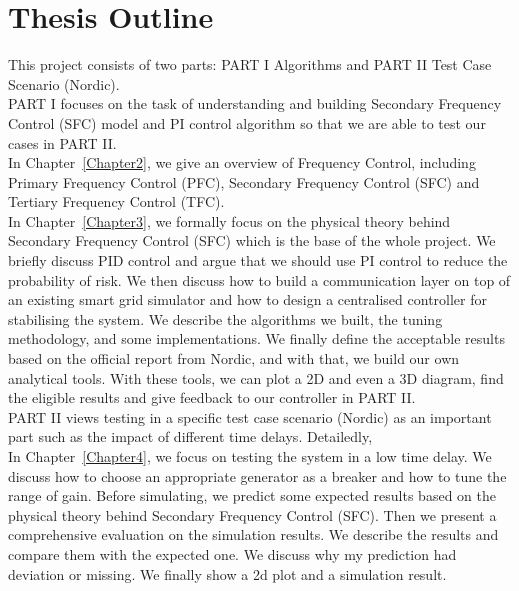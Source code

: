 \section{Thesis Outline} %
This project consists of two parts: PART I Algorithms and PART II Test Case Scenario (Nordic).\\

PART I focuses on the task of understanding and building Secondary Frequency Control (SFC) model and PI control algorithm so that we are able to test our cases in PART II.\\


In Chapter~\ref{Chapter2}, we give an overview of Frequency Control, including Primary Frequency Control (PFC), Secondary Frequency Control (SFC) and Tertiary Frequency Control (TFC).\\

In Chapter~\ref{Chapter3}, we formally focus on the physical theory behind Secondary Frequency Control (SFC) which is the base of the whole project. We briefly discuss PID control and argue that we should use PI control to reduce the probability of risk. We then discuss how to build a communication layer on top of an existing smart grid simulator and how to design a centralised controller for stabilising the system. We describe the algorithms we built, the tuning methodology, and some implementations. We finally define the acceptable results based on the official report from Nordic, and with that, we build our own analytical tools. With these tools, we can plot a 2D and even a 3D diagram, find the eligible results and give feedback to our controller in PART II.\\

PART II views testing in a specific test case scenario (Nordic) as an important part such as the impact of different time delays. Detailedly,\\

In Chapter~\ref{Chapter4}, we focus on testing the system in a low time delay. We discuss how to choose an appropriate generator as a breaker and how to tune the range of  gain. Before simulating, we predict some expected results based on the physical theory behind Secondary Frequency Control (SFC). Then we present a comprehensive evaluation on the simulation results. We describe the results and compare them with the expected one. We discuss why my prediction had deviation or missing. We finally show a 2d plot and a simulation result.\\

